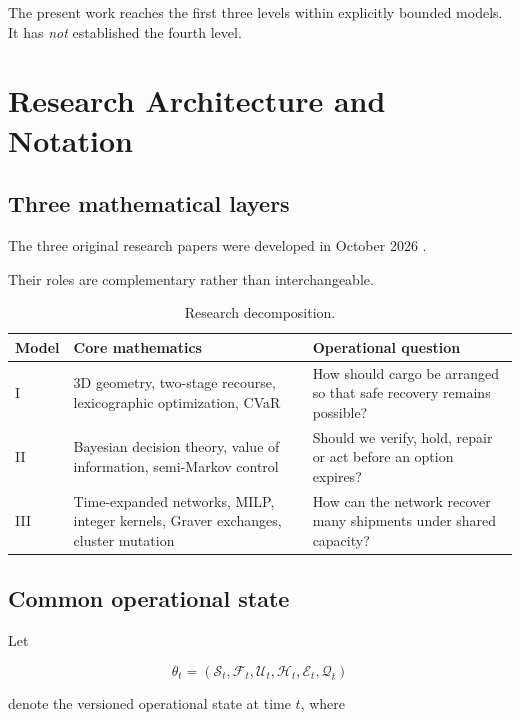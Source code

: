 \documentclass[10pt,a4paper]{article}
\theoremstyle{plain}
\theoremstyle{definition}
\theoremstyle{remark}
\begin{document}
The present work reaches the first three levels
within explicitly bounded models.
It has \emph{not} established the fourth level.

\section{Research Architecture and Notation}

\subsection{Three mathematical layers}

The three original research papers were developed
in October 2026
\cite{relaymodel1,relaymodel2,relaymodel3}.

Their roles are complementary rather than interchangeable.

\begin{table}[!htbp]
\centering
\caption{Research decomposition.}
\label{tab:three-models}
\small
\begin{tabularx}{\linewidth}{@{}p{19mm}p{37mm}L@{}}
\toprule
\textbf{Model} &
\textbf{Core mathematics} &
\textbf{Operational question} \\
\midrule
I &
3D geometry, two-stage recourse,
lexicographic optimization, CVaR &
How should cargo be arranged so that safe
recovery remains possible? \\
II &
Bayesian decision theory,
value of information,
semi-Markov control &
Should we verify, hold, repair or act
before an option expires? \\
III &
Time-expanded networks, MILP,
integer kernels, Graver exchanges,
cluster mutation &
How can the network recover many
shipments under shared capacity? \\
\bottomrule
\end{tabularx}
\end{table}

\subsection{Common operational state}

Let

\[
\theta_t =
\left(
  \mathcal S_t,
  \mathcal F_t,
  \mathcal U_t,
  \mathcal H_t,
  \mathcal E_t,
  \mathcal Q_t
\right)
\]

denote the versioned operational state at time \(t\),
where
\end{document}
